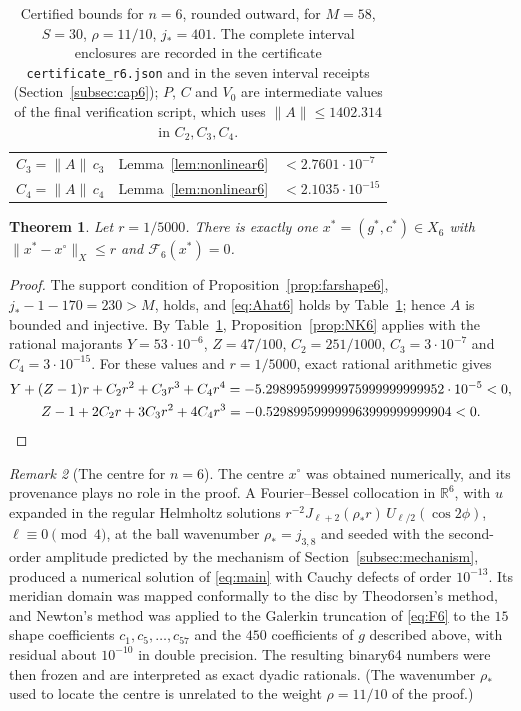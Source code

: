 \documentclass[11pt]{amsart}
\newtheorem{theorem}{Theorem}[section]
\theoremstyle{definition}
\theoremstyle{remark}
\newtheorem{remark}[theorem]{Remark}
\numberwithin{equation}{section}
\newcommand{\R}{\mathbb{R}}
\newcommand{\Fc}{\mathcal{F}}
\newcommand{\jst}{j_*}
\newcommand{\nrm}[1]{\lVert #1\rVert}
\begin{document}
\begin{table}[ht]
\begin{tabular}{@{}lll@{}}
$C_3=\nrm A\,c_3$ & Lemma~\ref{lem:nonlinear6} & $<2.7601\cdot10^{-7}$\\
$C_4=\nrm A\,c_4$ & Lemma~\ref{lem:nonlinear6} & $<2.1035\cdot10^{-15}$\\
\bottomrule
\end{tabular}
\caption{Certified bounds for $n=6$, rounded outward, for $M=58$, $S=30$, $\rho=11/10$, $\jst=401$. The complete interval enclosures are recorded in the certificate \texttt{certificate\_r6.json} and in the seven interval receipts (Section~\ref{subsec:cap6}); $P$, $C$ and $V_0$ are intermediate values of the final verification script, which uses $\nrm A\leq1402.314$ in $C_2,C_3,C_4$.}
\label{tab:bounds6}
\end{table}

\begin{theorem}\label{thm:zero6}
Let $r=1/5000$. There is exactly one $x^*=(g^*,c^*)\in X_6$ with $\nrm{x^*-x^\circ}_X\leq r$ and $\Fc_6(x^*)=0$.
\end{theorem}

\begin{proof}
The support condition of Proposition~\ref{prop:farshape6}, $\jst-1-170=230>M$, holds, and \eqref{eq:Ahat6} holds by Table~\ref{tab:bounds6}; hence $A$ is bounded and injective. By Table~\ref{tab:bounds6}, Proposition~\ref{prop:NK6} applies with the rational majorants $Y=53\cdot10^{-6}$, $Z=47/100$, $C_2=251/1000$, $C_3=3\cdot10^{-7}$ and $C_4=3\cdot10^{-15}$. For these values and $r=1/5000$, exact rational arithmetic gives
\begin{gather*}
Y+(Z-1)r+C_2r^2+C_3r^3+C_4r^4=-5.29899599999975999999999952\cdot10^{-5}<0,\\
Z-1+2C_2r+3C_3r^2+4C_4r^3=-0.529899599999963999999999904<0 . \qedhere
\end{gather*}
\end{proof}

\begin{remark}[The centre for $n=6$]\label{rem:centre6}
The centre $x^\circ$ was obtained numerically, and its provenance plays no role in the proof. A Fourier--Bessel collocation in $\R^6$, with $u$ expanded in the regular Helmholtz solutions $r^{-2}J_{\ell+2}(\rho_*r)\,U_{\ell/2}(\cos2\phi)$, $\ell\equiv0\pmod4$, at the ball wavenumber $\rho_*=j_{3,8}$ and seeded with the second-order amplitude predicted by the mechanism of Section~\ref{subsec:mechanism}, produced a numerical solution of \eqref{eq:main} with Cauchy defects of order $10^{-13}$. Its meridian domain was mapped conformally to the disc by Theodorsen's method, and Newton's method was applied to the Galerkin truncation of \eqref{eq:F6} to the $15$ shape coefficients $c_1,c_5,\ldots,c_{57}$ and the $450$ coefficients of $g$ described above, with residual about $10^{-10}$ in double precision. The resulting binary64 numbers were then frozen and are interpreted as exact dyadic rationals. (The wavenumber $\rho_*$ used to locate the centre is unrelated to the weight $\rho=11/10$ of the proof.)
\end{remark}
\end{document}
